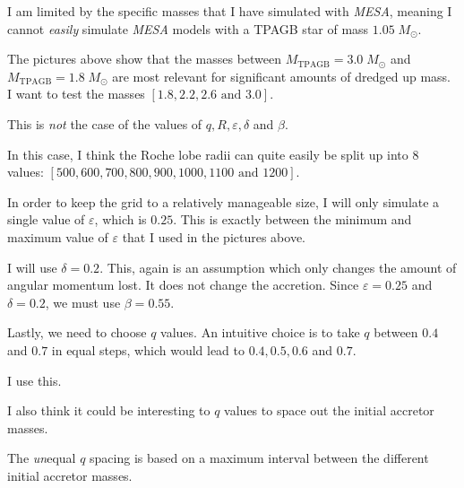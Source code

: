 \documentclass[a4paper,10pt]{article}
\begin{document}
I am limited by the specific masses that I have simulated with \emph{MESA}, meaning I cannot \emph{easily} simulate \emph{MESA} models with a TPAGB star of mass \(1.05\;M_\odot \).

The pictures above show that the masses between \(M_\text{TPAGB} = 3.0\;M_\odot \) and \(M_\text{TPAGB} = 1.8\;M_\odot \) are most relevant for significant amounts of dredged up mass. I want to test the masses \([1.8, 2.2, 2.6 \text{ and } 3.0]\).


This is \emph{not} the case of the values of \(q, R, \varepsilon, \delta \) and \(\beta \).

In this case, I think the Roche lobe radii can quite easily be split up into 8 values: \([500, 600, 700, 800, 900, 1000, 1100 \text{ and } 1200]\).

In order to keep the grid to a relatively manageable size, I will only simulate a single value of \(\varepsilon \), which is \(0.25\). This is exactly between the minimum and maximum value of \(\varepsilon  \) that I used in the pictures above.

I will use \(\delta = 0.2\). This, again is an assumption which only changes the amount of angular momentum lost. It does not change the accretion. Since \(\varepsilon =0.25\) and \(\delta =0.2\), we must use \(\beta =0.55\). 

Lastly, we need to choose \(q\) values. An intuitive choice is to take \(q\) between \(0.4\) and \(0.7\) in equal steps, which would lead to \(0.4, 0.5, 0.6\) and \(0.7\).

I use this.

I also think it could be interesting to \(q\) values to space out the initial accretor masses. 

\begin{figure}[ht]
    \centering
\end{figure}

The \emph{un}equal \(q\) spacing is based on a maximum interval between the different initial accretor masses.
\end{document}
